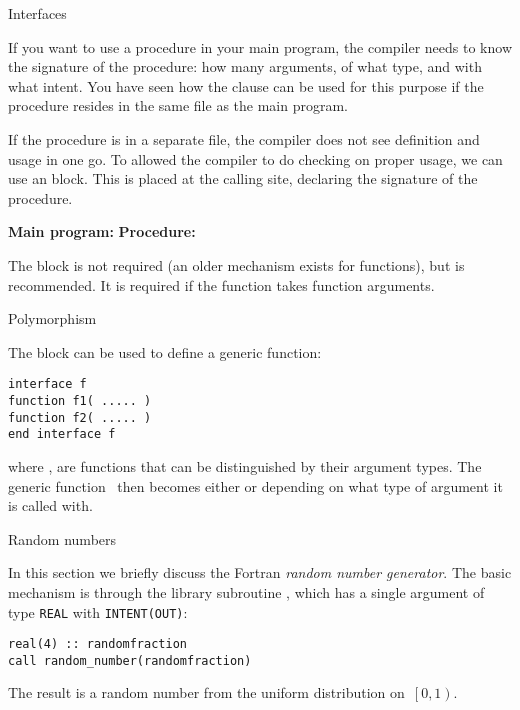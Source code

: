
 {Interfaces}
\label{sec:finterface}

If you want to use a procedure in your main program, the compiler
needs to know the signature of the procedure: how many arguments, of
what type, and with what intent. You have seen how the
 clause can be used for this purpose if the
procedure resides in the same file as the main program.

If the procedure is in a separate file, the compiler does not see
definition and usage in one go. To allowed the compiler to do checking
on proper usage, we can use an  block. This
is placed at the calling site, declaring the signature of the
procedure.

\begin{multicols}{2}
\textbf{Main program:}
\vfill\columnbreak
\textbf{Procedure:}
\end{multicols}

The  block is not required (an older
 mechanism exists for functions), but is
recommended.
It is required if the function takes function arguments.

 {Polymorphism}

The  block can be used to define a generic
function:
\begin{lstlisting}
interface f
function f1( ..... )
function f2( ..... )
end interface f
\end{lstlisting}
where , are functions that can be distinguished by their
argument types. The generic function~ then becomes either 
or  depending on what type of argument it is called with.

 {Random numbers}
\label{sec:randomf}

In this section we briefly discuss the Fortran \emph{random number
  generator}.
The basic mechanism is through the library subroutine
, which has a single argument of type
\lstinline{REAL} with \lstinline{INTENT(OUT)}:
\begin{lstlisting}
real(4) :: randomfraction
call random_number(randomfraction)
\end{lstlisting}
The result is a random number from the uniform distribution
on~$\left[0,1\right)$.
  
